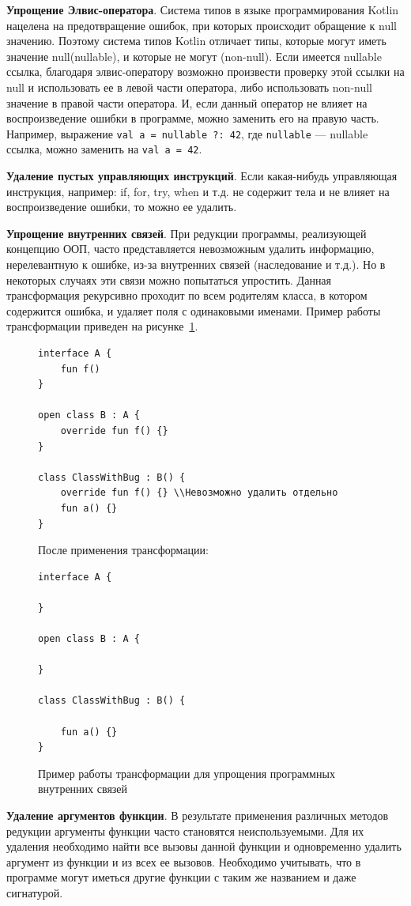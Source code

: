 \textbf{Упрощение Элвис-оператора}. Система типов в языке программирования Kotlin нацелена на предотвращение ошибок, при которых происходит обращение к null значению. Поэтому система типов Kotlin отличает типы, которые могут иметь значение null(nullable), и которые не могут (non-null). Если имеется nullable ссылка, благодаря элвис-оператору возможно произвести проверку этой ссылки на null и использовать ее в левой части оператора, либо использовать non-null значение в правой части оператора. И, если данный оператор не влияет на воспроизведение ошибки в программе, можно заменить его на правую часть. Например, выражение \texttt{val a = nullable ?: 42}, где \texttt{nullable} --- nullable ссылка, можно заменить на \texttt{val a = 42}.

\textbf{Удаление пустых управляющих инструкций}. Если какая-нибудь управляющая инструкция, например: if, for, try, when и т.д. не содержит тела и не влияет на воспроизведение ошибки, то можно ее удалить.

\textbf{Упрощение внутренних связей}. При редукции программы, реализующей концепцию ООП, часто представляется невозможным удалить информацию, нерелевантную к ошибке, из-за внутренних связей (наследование и т.д.). Но в некоторых случаях эти связи можно попытаться упростить. Данная трансформация рекурсивно проходит по всем родителям класса, в котором содержится ошибка, и удаляет поля с одинаковыми именами. Пример работы трансформации приведен на рисунке~\ref{ex:inh}.
\begin{figure}
\begin{lstlisting}
interface A {
    fun f()
}

open class B : A {
    override fun f() {}
}

class ClassWithBug : B() {
    override fun f() {} \\Невозможно удалить отдельно
    fun a() {}
}
\end{lstlisting}
После применения трансформации:
\begin{lstlisting}
interface A {

}

open class B : A {

}

class ClassWithBug : B() {

    fun a() {}
}
\end{lstlisting}
\caption{\label{ex:inh}Пример работы трансформации для упрощения программных внутренних связей}
\end{figure}

\textbf{Удаление аргументов функции}. В результате применения различных методов редукции аргументы функции часто становятся неиспользуемыми. Для их удаления необходимо найти все вызовы данной функции и одновременно удалить аргумент из функции и из всех ее вызовов. Необходимо учитывать, что в программе могут иметься другие функции с таким же названием и даже сигнатурой.

